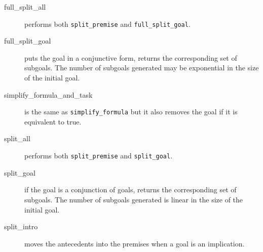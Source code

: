 \begin{description}

\item[full\_split\_all]
  performs both \texttt{split\_premise} and \texttt{full\_split\_goal}.

\item[full\_split\_goal] puts the goal in a conjunctive form,
  returns the corresponding set of subgoals. The number of subgoals
  generated may be exponential in the size of the initial goal.

\item[simplify\_formula\_and\_task] is the same as \texttt{simplify\_formula}
  but it also removes the goal if it is equivalent to true.

\item[split\_all]
  performs both \texttt{split\_premise} and \texttt{split\_goal}.

\item[split\_goal] if the goal is a conjunction of goals, returns the
  corresponding set of subgoals. The number of subgoals generated is linear in
  the size of the initial goal.

\item[split\_intro]
  moves the antecedents into the premises when a goal is an implication.

\end{description}



